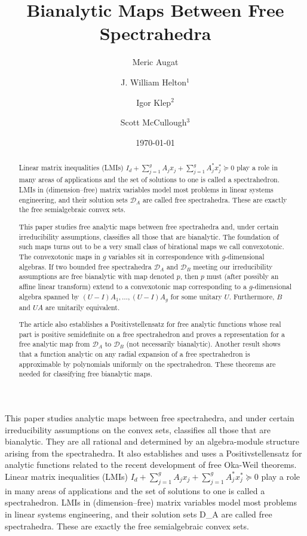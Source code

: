 \documentclass[11pt,makeidx]{amsart}
\title{Bianalytic Maps Between Free Spectrahedra}
\author[M.L. Augat]{Meric Augat}
\author[J.W. Helton]{J. William Helton${}^1$}
\author[I. Klep]{Igor Klep${}^{2}$}
\author[S. McCullough]{Scott McCullough${}^3$}
\date{\today}
\def\cD{\mathcal D}
\newcommand{\ct}{convexotonic\xspace}
\begin{document}


\begin{abstract} 
Linear matrix inequalities (LMIs)
$I_d + \sum_{j=1}^g A_jx_j + \sum_{j=1}^g 
A_j^*x_j^*
\succeq0$
play a role in many areas of applications
and the set of solutions to one is called a spectrahedron.
LMIs in (dimension--free)
matrix variables model most problems in linear systems engineering, and their solution sets $\cD_A$ are called free spectrahedra.
These are exactly the free semialgebraic convex sets.

  This paper studies free  analytic maps between free spectrahedra and, under certain  irreducibility assumptions,  classifies all those that are bianalytic.
  The foundation of such maps turns out to be a very small  class of birational maps we call \ct.  The \ct maps in $g$ variables sit in   
   correspondence
   with $g$-dimensional algebras.
   If two bounded free spectrahedra $\cD_A$ and $\cD_B$ meeting our irreducibility assumptions
    are free bianalytic with map denoted $p$,
  then $p$ must (after possibly an affine linear transform) extend to a  \ct map 
corresponding to a $g$-dimensional algebra spanned by  $(U-I)A_1,\ldots,(U-I)A_g$ for some unitary $U$.
Furthermore, 
 $B$ and $UA$ are unitarily equivalent.

The article also establishes  a Positivstellensatz for free analytic functions
whose real part is positive semidefinite on a free spectrahedron
and proves a representation for a free analytic map 
from $\cD_A$ to $\cD_B$ (not necessarily bianalytic).
Another result shows that a  function  analytic on any radial expansion
of a free spectrahedron  is approximable by 
polynomials uniformly  on the spectrahedron.
These theorems are needed for classifying free  bianalytic maps. 
\end{abstract}


\iffalse  %
This paper studies analytic maps between free spectrahedra, and under certain irreducibility assumptions on the convex sets, classifies all those that are bianalytic. They are all rational and determined by an algebra-module structure arising from the spectrahedra. It also establishes and uses a Positivstellensatz for analytic functions related to the recent development of free Oka-Weil theorems.
Linear matrix inequalities (LMIs) $I_d + \sum_{j=1}^g A_jx_j + \sum_{j=1}^g A_j^*x_j^*\succeq0$ play a role in many areas of applications and the set of solutions to one is called a spectrahedron. LMIs in (dimension--free) matrix variables model most problems in linear systems engineering, and their solution sets D_A are called free spectrahedra. These are exactly the free semialgebraic convex sets.
\end{document}
